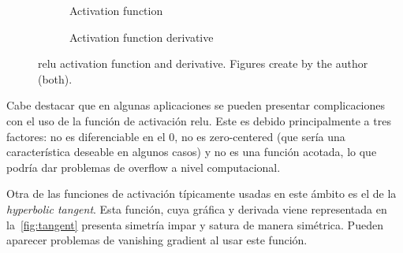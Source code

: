 \begin{figure}[ht]
  \centering
  \begin{subfigure}[b]{.375\textwidth}
    \centering
    \caption{Activation function}
  \end{subfigure}\hspace{3em}
  \begin{subfigure}[b]{.375\textwidth}
    \centering
    \caption{Activation function derivative}
  \end{subfigure}
  \caption[ activation function]{\Acf{relu} activation
    function and derivative. Figures create by the author (both).}%
  \label{fig:relu}
\end{figure}

Cabe destacar que en algunas aplicaciones se pueden presentar complicaciones
con el uso de la función de activación \gls{relu}. Este es debido
principalmente a tres factores: no es diferenciable en el \(0\), no es
zero-centered (que sería una característica deseable en algunos casos) y no
es una función acotada, lo que podría dar problemas de overflow a nivel
computacional.

Otra de las funciones de activación típicamente usadas en este ámbito es el de
la \emph{hyperbolic tangent}. Esta función, cuya
gráfica y derivada viene representada en la\ \vref{fig:tangent} presenta
simetría impar y satura de manera simétrica. Pueden aparecer problemas de
vanishing gradient al usar este función.

